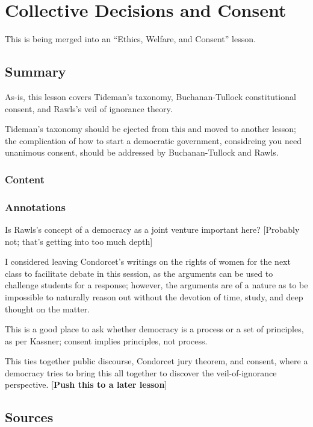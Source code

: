 \chapter{Collective Decisions and Consent}
This is being merged into an ``Ethics, Welfare, and Consent'' lesson.

\section{Summary}

As-is, this lesson covers Tideman's taxonomy, Buchanan-Tullock constitutional consent, and Rawls's veil of ignorance theory.

Tideman's taxonomy should be ejected from this and moved to another lesson; the complication of how to start a democratic government, considreing you need unanimous consent, should be addressed by Buchanan-Tullock and Rawls.

\subsection{Content}

\subsection{Annotations}

Is Rawls's concept of a democracy as a joint venture important here? [Probably not; that's getting into too much depth]

I considered leaving Condorcet's writings on the rights of women for the next class to facilitate debate in this session, as the arguments can be used to challenge students for a response; however, the arguments are of a nature as to be impossible to naturally reason out without the devotion of time, study, and deep thought on the matter.

This is a good place to ask whether democracy is a process or a set of principles, as per Kassner; consent implies principles, not process.

This ties together public discourse, Condorcet jury theorem, and consent, where a democracy tries to bring this all together to discover the veil-of-ignorance perspective. [\textbf{Push this to a later lesson}]

\section{Sources}

